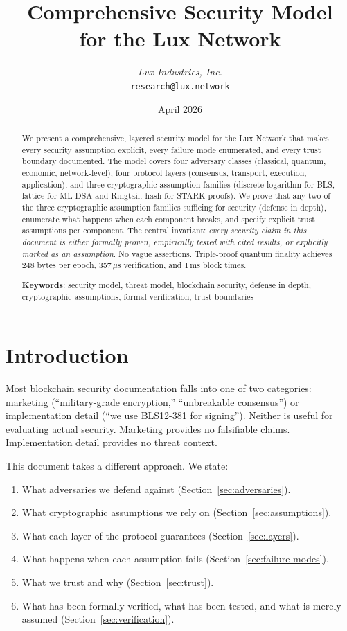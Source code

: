 \documentclass[11pt,a4paper]{article}
\title{\textbf{Comprehensive Security Model\\for the Lux Network}}
\author{
\textit{Lux Industries, Inc.}\\
\texttt{research@lux.network}
}
\date{April 2026}
\begin{document}
\luxcoverpage

\begin{abstract}
We present a comprehensive, layered security model for the Lux Network that makes
every security assumption explicit, every failure mode enumerated, and every trust
boundary documented. The model covers four adversary classes (classical, quantum,
economic, network-level), four protocol layers (consensus, transport, execution,
application), and three cryptographic assumption families (discrete logarithm for BLS,
lattice for ML-DSA and Ringtail, hash for STARK proofs). We prove that any two of the
three cryptographic assumption families sufficing for security (defense in depth),
enumerate what happens when each component breaks, and specify explicit trust
assumptions per component. The central invariant: \emph{every security claim in this
document is either formally proven, empirically tested with cited results, or
explicitly marked as an assumption}. No vague assertions. Triple-proof quantum finality
achieves 248 bytes per epoch, 357\,$\mu$s verification, and 1\,ms block times.

\textbf{Keywords}: security model, threat model, blockchain security, defense in depth,
cryptographic assumptions, formal verification, trust boundaries
\end{abstract}

\tableofcontents
\newpage

\section{Introduction}
\label{sec:introduction}

Most blockchain security documentation falls into one of two categories: marketing
(``military-grade encryption,'' ``unbreakable consensus'') or implementation detail
(``we use BLS12-381 for signing''). Neither is useful for evaluating actual security.
Marketing provides no falsifiable claims. Implementation detail provides no threat
context.

This document takes a different approach. We state:

\begin{enumerate}[leftmargin=2em]
  \item What adversaries we defend against (Section~\ref{sec:adversaries}).
  \item What cryptographic assumptions we rely on (Section~\ref{sec:assumptions}).
  \item What each layer of the protocol guarantees (Section~\ref{sec:layers}).
  \item What happens when each assumption fails (Section~\ref{sec:failure-modes}).
  \item What we trust and why (Section~\ref{sec:trust}).
  \item What has been formally verified, what has been tested, and what is merely
        assumed (Section~\ref{sec:verification}).
\end{enumerate}
\end{document}
